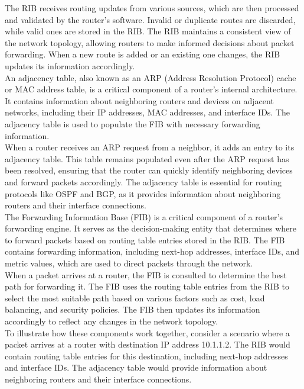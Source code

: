 \documentclass[parindent=0pt]{article}
\begin{document}
The RIB receives routing updates from various sources, which are then processed and validated by the router's software. Invalid or duplicate routes are discarded, while valid ones are stored in the RIB. The RIB maintains a consistent view of the network topology, allowing routers to make informed decisions about packet forwarding. When a new route is added or an existing one changes, the RIB updates its information accordingly.\\

An adjacency table, also known as an ARP (Address Resolution Protocol) cache or MAC address table, is a critical component of a router's internal architecture. It contains information about neighboring routers and devices on adjacent networks, including their IP addresses, MAC addresses, and interface IDs. The adjacency table is used to populate the FIB with necessary forwarding information.\\

When a router receives an ARP request from a neighbor, it adds an entry to its adjacency table. This table remains populated even after the ARP request has been resolved, ensuring that the router can quickly identify neighboring devices and forward packets accordingly. The adjacency table is essential for routing protocols like OSPF and BGP, as it provides information about neighboring routers and their interface connections.\\

The Forwarding Information Base (FIB) is a critical component of a router's forwarding engine. It serves as the decision-making entity that determines where to forward packets based on routing table entries stored in the RIB. The FIB contains forwarding information, including next-hop addresses, interface IDs, and metric values, which are used to direct packets through the network.\\

When a packet arrives at a router, the FIB is consulted to determine the best path for forwarding it. The FIB uses the routing table entries from the RIB to select the most suitable path based on various factors such as cost, load balancing, and security policies. The FIB then updates its information accordingly to reflect any changes in the network topology.\\

To illustrate how these components work together, consider a scenario where a packet arrives at a router with destination IP address 10.1.1.2. The RIB would contain routing table entries for this destination, including next-hop addresses and interface IDs. The adjacency table would provide information about neighboring routers and their interface connections.\\
\end{document}
